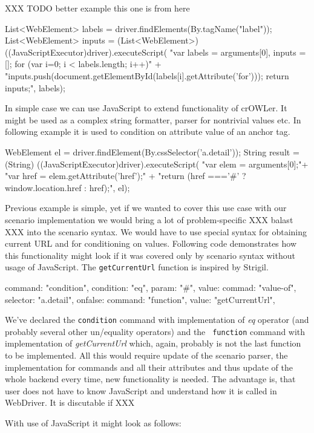 XXX TODO better example this one is from
here~

\begtt
List<WebElement> labels = driver.findElements(By.tagName("label"));
List<WebElement> inputs = (List<WebElement>) ((JavaScriptExecutor)driver).executeScript(
    "var labels = arguments[0], inputs = []; for (var i=0; i < labels.length; i++){" +
    "inputs.push(document.getElementById(labels[i].getAttribute('for'))); } return inputs;", labels);
\endtt

In simple case we can use JavaScript to extend functionality of crOWLer. It
might be used as a complex string formatter, parser for nontrivial values etc. 
In following example it is used to condition on attribute value of an anchor
tag. 

\begtt
WebElement el = driver.findElement(By.cssSelector('a.detail'));
String result = (String) ((JavaScriptExecutor)driver).executeScript(
"var elem = arguments[0];"+
"var href = elem.getAttribute('href');" +
"return (href ==='#' ? window.location.href : href);", el);
\endtt

Previous example is simple, yet if we wanted to cover this use case with our
scenario implementation we would bring a lot of problem-specific XXX balast XXX
into the scenario syntax. We would have to use special syntax for obtaining
current URL and for conditioning on values. Following code demonstrates how this 
functionality might look if it was covered only by scenario syntax without usage
of JavaScript. The {\tt getCurrentUrl} function is inspired by Strigil. 

\begtt
{
  command: "condition", 
  condition: "eq", 
  param: "#", 
  value: {
    commad: "value-of", 
    selector: "a.detail", 
  }
  onfalse: {
    command: "function", 
    value: "getCurrentUrl", 
  }
}
\endtt

We've declared the {\tt condition} command with implementation of {\em eq}
operator (and probably several other un/equality operators) and the {\tt
function} command with implementation of {\em getCurrentUrl} which, again,
probably is not the last function to be implemented. All this would require
update of the scenario parser, the implementation for commands and all their
attributes and thus update of the whole backend every time, new functionality is
needed. The advantage is, that user does not have to know JavaScript and
understand how it is called in WebDriver. It is discutable if XXX

With use of JavaScript it might look as follows: 

